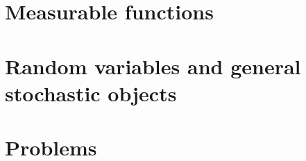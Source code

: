 %
%
%
%

\section{Measurable functions}





\section{Random variables and general stochastic objects}


\section{Problems}

